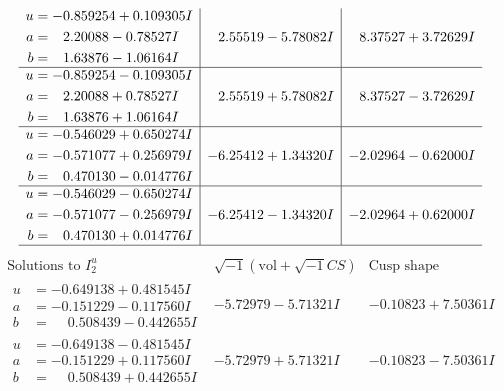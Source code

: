 \documentclass[1p]{elsarticle_modified}
\theoremstyle{definition}
\newcommand{\I}{\sqrt{-1}}
\begin{document}
$$\begin{array}{c|c|c}
\begin{aligned}
u &= -0.859254 + 0.109305 I \\
a &= \phantom{-}2.20088 - 0.78527 I \\
b &= \phantom{-}1.63876 - 1.06164 I\end{aligned}
 & \phantom{-}2.55519 - 5.78082 I & \phantom{-}8.37527 + 3.72629 I \\ \hline\begin{aligned}
u &= -0.859254 - 0.109305 I \\
a &= \phantom{-}2.20088 + 0.78527 I \\
b &= \phantom{-}1.63876 + 1.06164 I\end{aligned}
 & \phantom{-}2.55519 + 5.78082 I & \phantom{-}8.37527 - 3.72629 I \\ \hline\begin{aligned}
u &= -0.546029 + 0.650274 I \\
a &= -0.571077 + 0.256979 I \\
b &= \phantom{-}0.470130 - 0.014776 I\end{aligned}
 & -6.25412 + 1.34320 I & -2.02964 - 0.62000 I \\ \hline\begin{aligned}
u &= -0.546029 - 0.650274 I \\
a &= -0.571077 - 0.256979 I \\
b &= \phantom{-}0.470130 + 0.014776 I\end{aligned}
 & -6.25412 - 1.34320 I & -2.02964 + 0.62000 I\\
 \hline 
 \end{array}$$\newpage$$\begin{array}{c|c|c}  
\text{Solutions to }I^u_{2}& \I (\text{vol} + \sqrt{-1}CS) & \text{Cusp shape}\\
 \hline 
\begin{aligned}
u &= -0.649138 + 0.481545 I \\
a &= -0.151229 - 0.117560 I \\
b &= \phantom{-}0.508439 - 0.442655 I\end{aligned}
 & -5.72979 - 5.71321 I & -0.10823 + 7.50361 I \\ \hline\begin{aligned}
u &= -0.649138 - 0.481545 I \\
a &= -0.151229 + 0.117560 I \\
b &= \phantom{-}0.508439 + 0.442655 I\end{aligned}
 & -5.72979 + 5.71321 I & -0.10823 - 7.50361 I \\ \hline\begin{aligned}

\end{aligned}
\end{array}$$
\end{document}

